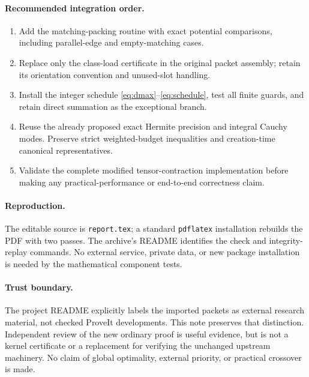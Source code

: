 \documentclass[11pt]{article}
\theoremstyle{remark}\newtheorem{remark}[theorem]{Remark}
\begin{document}
\paragraph{Recommended integration order.}
\begin{enumerate}
\item Add the matching-packing routine with exact potential comparisons, including parallel-edge and empty-matching cases.
\item Replace only the class-load certificate in the original packet assembly; retain its orientation convention and unused-slot handling.
\item Install the integer schedule \eqref{eq:dmax}--\eqref{eq:schedule}, test all finite guards, and retain direct summation as the exceptional branch.
\item Reuse the already proposed exact Hermite precision and integral Cauchy modes. Preserve strict weighted-budget inequalities and creation-time canonical representatives.
\item Validate the complete modified tensor-contraction implementation before making any practical-performance or end-to-end correctness claim.
\end{enumerate}

\paragraph{Reproduction.}
The editable source is \texttt{report.tex}; a standard \texttt{pdflatex} installation rebuilds the PDF with two passes. The archive's README identifies the check and integrity-replay commands. No external service, private data, or new package installation is needed by the mathematical component tests.

\paragraph{Trust boundary.}
The project README explicitly labels the imported packets as external research material, not checked ProveIt developments. This note preserves that distinction. Independent review of the new ordinary proof is useful evidence, but is not a kernel certificate or a replacement for verifying the unchanged upstream machinery. No claim of global optimality, external priority, or practical crossover is made.
\end{document}
